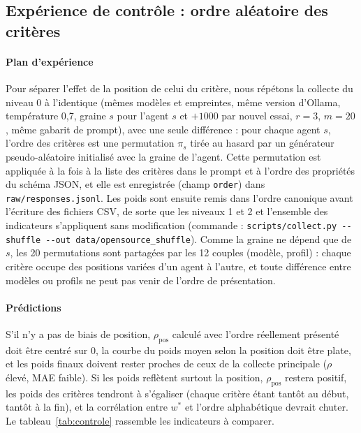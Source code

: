 \documentclass[11pt,a4paper]{article}
\newcommand{\code}[1]{\texttt{#1}}
\begin{document}
\subsection{Expérience de contrôle : ordre aléatoire des critères}\label{sec:controle}

\paragraph{Plan d'expérience} Pour séparer l'effet de la position de celui du critère, nous répétons la collecte du niveau 0 à l'identique (mêmes modèles et empreintes, même version d'Ollama, température 0,7, graine $s$ pour l'agent $s$ et $+1000$ par nouvel essai, $r=3$, $m=20$, même gabarit de prompt), avec une seule différence : pour chaque agent $s$, l'ordre des critères est une permutation $\pi_s$ tirée au hasard par un générateur pseudo-aléatoire initialisé avec la graine de l'agent. Cette permutation est appliquée à la fois à la liste des critères dans le prompt et à l'ordre des propriétés du schéma JSON, et elle est enregistrée (champ \code{order}) dans \code{raw/responses.jsonl}. Les poids sont ensuite remis dans l'ordre canonique avant l'écriture des fichiers CSV, de sorte que les niveaux 1 et 2 et l'ensemble des indicateurs s'appliquent sans modification (commande : \code{scripts/collect.py -{}-shuffle -{}-out data/opensource\_shuffle}). Comme la graine ne dépend que de $s$, les 20 permutations sont partagées par les 12 couples (modèle, profil) : chaque critère occupe des positions variées d'un agent à l'autre, et toute différence entre modèles ou profils ne peut pas venir de l'ordre de présentation.

\paragraph{Prédictions} S'il n'y a pas de biais de position, $\rho_{\mathrm{pos}}$ calculé avec l'ordre réellement présenté doit être centré sur 0, la courbe du poids moyen selon la position doit être plate, et les poids finaux doivent rester proches de ceux de la collecte principale ($\rho$ élevé, MAE faible). Si les poids reflètent surtout la position, $\rho_{\mathrm{pos}}$ restera positif, les poids des critères tendront à s'égaliser (chaque critère étant tantôt au début, tantôt à la fin), et la corrélation entre $w^*$ et l'ordre alphabétique devrait chuter. Le tableau~\ref{tab:controle} rassemble les indicateurs à comparer.
\end{document}
